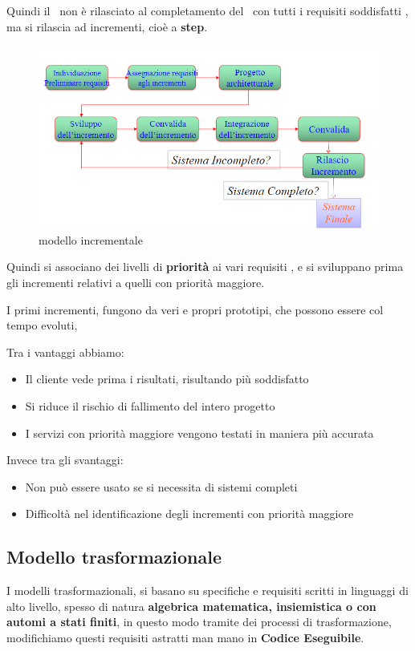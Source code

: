 Quindi il \sw\ non \`e rilasciato al completamento del \sw\ con tutti i requisiti soddisfatti
, ma si rilascia ad incrementi, cio\`e a \textbf{step}.
\begin{figure}[htbp]
    \centering    
    \includegraphics[scale=0.7]{modello_incrementale.PNG}
    \caption{modello incrementale}
    \label{fig:modello incrementale}
\end{figure}  
Quindi si associano dei livelli di \textbf{priorit\`a} ai vari requisiti
, e si sviluppano prima gli incrementi relativi a quelli con priorit\`a maggiore.

I primi incrementi, fungono da veri e propri prototipi, che possono essere col tempo evoluti,

Tra i vantaggi abbiamo:
\begin{itemize}
    \item Il cliente vede prima i risultati, risultando pi\`u soddisfatto
    \item Si riduce il rischio di fallimento del intero progetto
    \item I servizi con priorit\`a maggiore vengono testati in maniera pi\`u accurata
\end{itemize}
Invece tra gli svantaggi:
\begin{itemize}
    \item Non pu\`o essere usato se si necessita di sistemi completi
    \item Difficolt\`a nel identificazione degli incrementi con priorit\`a maggiore
\end{itemize}
\subsection{Modello trasformazionale}
I modelli trasformazionali, si basano su specifiche e requisiti scritti in linguaggi di
alto livello, spesso di natura \textbf{algebrica matematica, insiemistica o con automi a stati finiti},
in questo modo tramite 
dei processi di trasformazione, modifichiamo questi requisiti astratti 
man mano in \textbf{Codice Eseguibile}.

